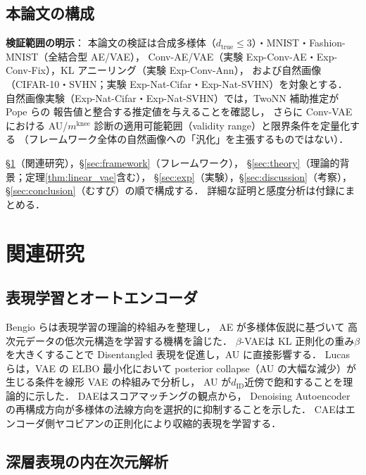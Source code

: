 \documentclass[11pt,a4paper]{jsarticle}
\newcommand{\mknee}{m^{\mathrm{knee}}}
\begin{document}
\subsection{本論文の構成}\label{sec:intro_structure}

\textbf{検証範囲の明示}：
本論文の検証は合成多様体（$d_{\mathrm{true}} \leq 3$）・MNIST・Fashion-MNIST（全結合型 AE/VAE），
Conv-AE/VAE（実験 Exp-Conv-AE・Exp-Conv-Fix），KL アニーリング（実験 Exp-Conv-Ann），
および自然画像（CIFAR-10・SVHN；実験 Exp-Nat-Cifar・Exp-Nat-SVHN）を対象とする．
自然画像実験（Exp-Nat-Cifar・Exp-Nat-SVHN）では，TwoNN 補助推定が Pope ら\cite{pope2021intrinsic}の
報告値と整合する推定値を与えることを確認し，
さらに Conv-VAE における AU/$\mknee$ 診断の適用可能範囲（validity range）と限界条件を定量化する
（フレームワーク全体の自然画像への「汎化」を主張するものではない）．

§\ref{sec:related}（関連研究），§\ref{sec:framework}（フレームワーク），
§\ref{sec:theory}（理論的背景；定理\ref{thm:linear_vae}含む），
§\ref{sec:exp}（実験），§\ref{sec:discussion}（考察），§\ref{sec:conclusion}（むすび）の順で構成する．
詳細な証明と感度分析は付録にまとめる．

\section{関連研究}\label{sec:related}

\subsection{表現学習とオートエンコーダ}\label{sec:related_ae}

Bengio ら\cite{bengio2013representation}は表現学習の理論的枠組みを整理し，
AE が多様体仮説\cite{fefferman2016manifold}に基づいて
高次元データの低次元構造を学習する機構を論じた．
$\beta$-VAE\cite{higgins2017betavae}は KL 正則化の重み$\beta$を大きくすることで
Disentangled 表現を促進し，AU に直接影響する．
Lucas ら\cite{lucas2019elbo}は，VAE の ELBO 最小化において
posterior collapse（AU の大幅な減少）が生じる条件を線形 VAE の枠組みで分析し，
AU が$d_{\mathrm{ID}}$近傍で飽和することを理論的に示した．
DAE\cite{alain2014dae}はスコアマッチングの観点から，
Denoising Autoencoder の再構成方向が多様体の法線方向を選択的に抑制することを示した．
CAE\cite{rifai2011cae}はエンコーダ側ヤコビアンの正則化により収縮的表現を学習する．

\subsection{深層表現の内在次元解析}\label{sec:related_id}
\end{document}
